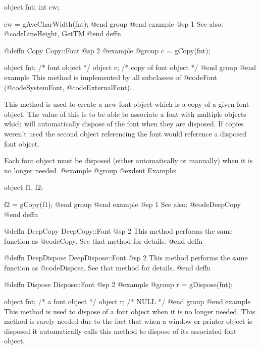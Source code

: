 object  fnt;
int     cw;

cw = gAveCharWidth(fnt);
@end group
@end example
@sp 1
See also:  @code{LineHeight, GetTM}
@end deffn










@deffn {Copy} Copy::Font
@sp 2
@example
@group
c = gCopy(fnt);

object  fnt;    /*  font object          */
object  c;      /*  copy of font object  */
@end group
@end example
This method is implemented by all subclasses of @code{Font}
(@code{SystemFont}, @code{ExternalFont}).

This method is used to create a new font object which is a copy of a
given font object.  The value of this is to be able to associate a
font with multiple objects which will automatically dispose of the
font when they are disposed.  If copies weren't used the second object
referencing the font would reference a disposed font object.

Each font object must be disposed (either automatically or manually)
when it is no longer needed.
@example
@group
@exdent Example:

object  f1, f2;

f2 = gCopy(f1);
@end group
@end example
@sp 1
See also:  @code{DeepCopy}
@end deffn











@deffn {DeepCopy} DeepCopy::Font
@sp 2
This method performs the same function as @code{Copy}.  See that
method for details.
@end deffn











@deffn {DeepDispose} DeepDispose::Font
@sp 2
This method performs the same function as @code{Dispose}.  See that
method for details.
@end deffn








@deffn {Dispose} Dispose::Font
@sp 2
@example
@group
r = gDispose(fnt);

object  fnt;   /*  a font object  */
object  r;     /*  NULL           */
@end group
@end example
This method is used to dispose of a font object when it is no longer
needed.  This method is rarely needed due to the fact that when a window
or printer object is disposed it automatically calls this method to
dispose of its associated font object.


